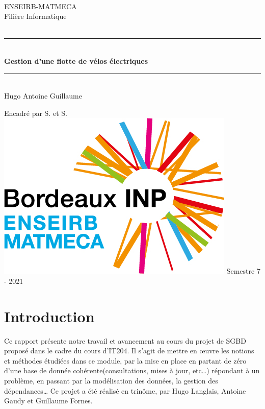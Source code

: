 \documentclass[10pt]{article}
\begin{document}
  \begin{titlepage}
    ~ \vfill
    \begin{center}
      \LARGE ENSEIRB-MATMECA\\ \LARGE Filière Informatique\\[1.5 cm]

      {\Large \bfseries {}}\\[0.5 cm]

      \rule{\linewidth}{0.5 mm}\\[0.4 cm] {\Huge \bfseries Gestion d'une flotte de vélos électriques\\[0.2 cm]} \rule{\linewidth}{0.5 mm}\\[1.5 cm] {\Large
      Hugo  \quad Antoine  \quad Guillaume  \\[0.5 cm]}

      {\large Encadré par S.  et S. }\\ \vfill
      \includegraphics[scale=0.4]{logo_em-bxinp} \vfill
      {\large Semestre 7 - 2021}
    \end{center}
  \end{titlepage}

  \tableofcontents
  \newpage

  \section{Introduction}\label{sec:intro}
  Ce rapport présente notre travail et avancement au cours du projet de SGBD proposé dans le cadre du cours d'IT204.
  Il s'agit de mettre en \oe uvre les notions et méthodes étudiées dans ce module, par la mise en place en partant de zéro d'une
  base de donnée cohérente(consultations, mises à jour, etc\dots) répondant à un problème, en passant par la modélisation
  des données, la gestion des dépendances\dots
  Ce projet a été réalisé en trinôme, par Hugo Langlais, Antoine Gaudy et Guillaume Fornes.\\
\end{document}
